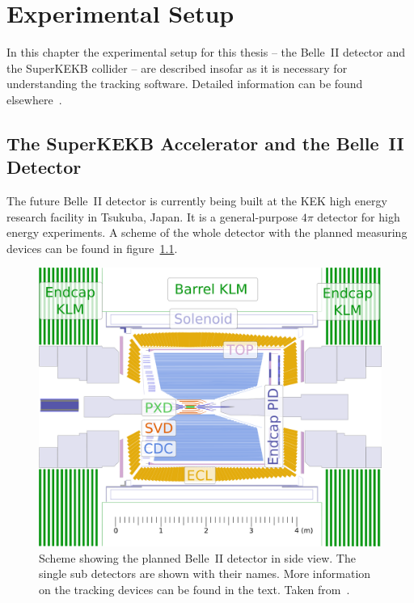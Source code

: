 \chapter{Experimental Setup} \label{chapter-ex}
In this chapter the experimental setup for this thesis -- the Belle~II detector and the SuperKEKB collider -- are described insofar as it is necessary for understanding the tracking software. Detailed information can be found elsewhere~\cite{tdr}.


\section{The SuperKEKB Accelerator and the Belle~II Detector}

The future Belle~II detector is currently being built at the KEK high energy research facility in Tsukuba, Japan. It is a general-purpose $4\pi$ detector for high energy experiments. A scheme of the whole detector with the planned measuring devices can be found in figure~\ref{fig-belle2}.

\begin{figure}
 \centering
 \includegraphics[height=0.4\textheight]{figures/experimental_setup/detector_crossection_labels.pdf}
 \caption[Schema of the planned Belle~II detector.]{Scheme showing the planned Belle~II detector in side view. The single sub detectors are shown with their names. More information on the tracking devices can be found in the text. Taken from~\cite{christian}.}
 \label{fig-belle2}
\end{figure}


